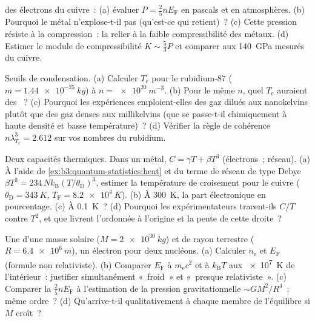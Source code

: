 \begin{exercise}[$\star$]\label{exo:b3:quantum-statistics:3}
 des électrons du cuivre~: (a) évaluer $P =
\tfrac25 nE_{\text{F}}$ en pascals et en atmosphères. (b) Pourquoi le
métal n'explose-t-il pas (qu'est-ce qui retient)~? (c) Cette pression
résiste à la compression~: la relier à la faible compressibilité des
métaux. (d) Estimer le module de compressibilité $K \sim \tfrac53 P$
et comparer aux \qty{140}{GPa} mesurés du cuivre.
\end{exercise}

\begin{exercise}[$\star$]\label{exo:b3:quantum-statistics:4}
Seuils de condensation. (a) Calculer $T_{\text{c}}$ pour le
rubidium-87 ($m =
\qty{1.44e-25}{kg}$) à $n = \qty{e20}{m^{-3}}$. (b) Pour le même $n$,
quel $T_{\text{c}}$ auraient des ~? (c) Pourquoi
les expériences emploient-elles des gaz dilués aux nanokelvins plutôt
que des gaz denses aux millikelvins (que se passe-t-il chimiquement à
haute densité et basse température)~? (d) Vérifier la règle de
cohérence $n\lambda_{T_c}^3
= 2.612$ sur vos nombres du rubidium.
\end{exercise}

\begin{exercise}[$\star\star$]\label{exo:b3:quantum-statistics:5}
Deux capacités thermiques. Dans un métal, $C = \gamma T +
\beta T^3$ (électrons~; réseau). (a) À l'aide de
\cref{ex:b3:quantum-statistics:heat} et du terme de réseau de type
Debye $\beta T^3 = 234\,Nk_{\text{B}}(T/\theta_{\text{D}})^3$,
estimer la température de croisement pour le cuivre
($\theta_{\text{D}} = \qty{343}{K}$, $T_{\text{F}} =
\qty{8.2e4}{K}$). (b) À \qty{300}{K}, la part électronique en
pourcentage. (c) À \qty{0.1}{K}~? (d) Pourquoi les expérimentateurs
tracent-ils $C/T$ contre $T^2$, et que livrent l'ordonnée à l'origine
et la pente de cette droite~?
\end{exercise}

\begin{exercise}[$\star\star$]\label{exo:b3:quantum-statistics:6}
Une  d'une masse solaire ($M = \qty{2e30}{kg}$) et de
rayon terrestre ($R = \qty{6.4e6}{m}$), un électron pour deux
nucléons. (a) Calculer $n_{\text{e}}$ et $E_{\text{F}}$ (formule non
relativiste). (b) Comparer $E_{\text{F}}$ à $m_{\text{e}}c^2$ et à
$k_{\text{B}}T$ aux \qty{e7}{K} de l'intérieur~: justifier
simultanément «~froid~» et «~presque relativiste~». (c) Comparer la
 $\tfrac25 nE_{\text{F}}$ à l'estimation de
la pression gravitationnelle $\sim GM^2/R^4$~: même ordre~? (d) Qu'arrive-t-il qualitativement à
chaque membre de l'équilibre si $M$ croît~?
\end{exercise}

